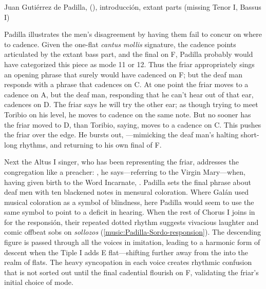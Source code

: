 \begin{musicexample}
    \caption{Juan Gutiérrez de Padilla, 
    (), introducción, extant parts (missing Tenor I,
    Bassus I)}

    \label{music:Padilla-Sordo-intro}
\end{musicexample}

Padilla illustrates the men's disagreement by having them fail to concur on
where to cadence.
Given the one-flat \emph{cantus mollis} signature, the cadence points
articulated by the extant bass part, and the final on F, Padilla probably would
have categorized this piece as mode 11 or 12.%
    \Autocites
    [873--882]{Cerone:Melopeo} 
    {Judd:RenaissanceModalTheory}{Barnett:TonalOrganization17C}  
Thus the friar appropriately sings an opening phrase that surely would have
cadenced on F; but the deaf man responds with a phrase that cadences on C.
At one point the friar moves to a cadence on A, but the deaf man, responding
that he can't hear out of that ear, cadences on D. 
The friar says he will try the other ear; as though trying to meet Toribio on
his level, he moves to cadence on the same note.
But no sooner has the friar moved to D, than Toribio, saying,  moves to a cadence on C.  
This pushes the friar over the edge.
He bursts out, ---mimicking the deaf man's
halting short-long rhythms, and returning to his own final of F.

Next the Altus I singer, who has been representing the friar, addresses the
congregation like a preacher: , he says---referring to the Virgin Mary---when, having given birth to the
Word Incarnate, .  
Padilla sets the final phrase about deaf men with ten blackened notes in
mensural coloration.
Where Galán used musical coloration as a symbol of blindness, here Padilla would
seem to use the same symbol to point to a deficit in hearing.
When the rest of Chorus I joins in for the responsión, their repeated dotted
rhythm suggests vivacious laughter and comic offbeat sobs on \emph{sollozos}
(\cref{music:Padilla-Sordo-responsion}).
The descending figure is passed through all the voices in imitation, leading to
a harmonic form of descent when the Tiple I adds E flat---shifting further away
from the  into the  realm of flats.
The heavy syncopation in each voice creates rhythmic confusion that is not
sorted out until the final cadential flourish on F, validating the friar's
initial choice of mode.

